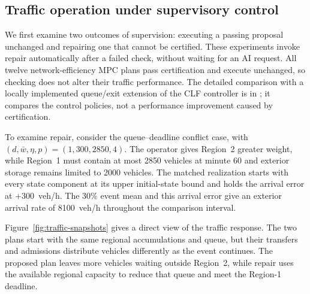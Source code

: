 \subsection{Traffic operation under supervisory control}
\label{sec:new-incident-protocol}
\label{sec:controller-benchmarks}
\label{sec:new-mpc-results}
\label{sec:repair-results}

We first examine two outcomes of supervision: executing a passing proposal
unchanged and repairing one that cannot be certified.
These experiments invoke repair automatically after a failed check,
without waiting for an AI request.
All twelve network-efficiency MPC plans pass certification and execute
unchanged, so checking does not alter their traffic performance. The
detailed comparison with a locally implemented queue/exit extension of
the CLF controller \cite{zhong2018robust} is in
; it compares the control policies, not a
performance improvement caused by certification.

To examine repair, consider the queue--deadline conflict case, with
$(d,\bar w,\eta,p)=(1,300,2850,4)$. The operator gives
Region~2 greater weight, while Region~1 must contain at most 2850 vehicles
at minute 60 and exterior storage remains limited to 2000 vehicles.
The matched realization starts with every state component at its upper
initial-state bound and holds the arrival error at $+300$~veh/h.
The 30\% event mean and this arrival error give an exterior arrival rate of
8100~veh/h throughout the comparison interval.

Figure~\ref{fig:traffic-snapshots} gives a direct view of the traffic
response. The two plans start with the same regional accumulations and
queue, but their transfers and admissions distribute vehicles differently
as the event continues. The proposed plan leaves more vehicles waiting
outside Region~2, while repair uses the available regional capacity to
reduce that queue and meet the Region-1 deadline.


